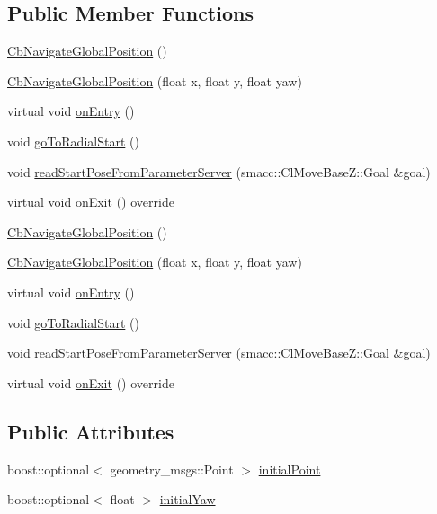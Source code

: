 \subsection*{Public Member Functions}
\begin{DoxyCompactItemize}
\item 
\hyperlink{classsm__dance__bot_1_1CbNavigateGlobalPosition_a18007aa2d7d814c39361d20c83694997}{Cb\+Navigate\+Global\+Position} ()
\item 
\hyperlink{classsm__dance__bot_1_1CbNavigateGlobalPosition_afec2628e2bf007b1356a3a328ac4f490}{Cb\+Navigate\+Global\+Position} (float x, float y, float yaw)
\item 
virtual void \hyperlink{classsm__dance__bot_1_1CbNavigateGlobalPosition_a281fe5c962ca5004f44e929159991c6a}{on\+Entry} ()
\item 
void \hyperlink{classsm__dance__bot_1_1CbNavigateGlobalPosition_a0832f7a7f205cc483be012aef9501312}{go\+To\+Radial\+Start} ()
\item 
void \hyperlink{classsm__dance__bot_1_1CbNavigateGlobalPosition_a81b78925b3ab8a426f471cb74d0b9756}{read\+Start\+Pose\+From\+Parameter\+Server} (smacc\+::\+Cl\+Move\+Base\+Z\+::\+Goal \&goal)
\item 
virtual void \hyperlink{classsm__dance__bot_1_1CbNavigateGlobalPosition_a63737ce810efefc8c29e6b1b332d2e11}{on\+Exit} () override
\item 
\hyperlink{classsm__dance__bot_1_1CbNavigateGlobalPosition_a18007aa2d7d814c39361d20c83694997}{Cb\+Navigate\+Global\+Position} ()
\item 
\hyperlink{classsm__dance__bot_1_1CbNavigateGlobalPosition_afec2628e2bf007b1356a3a328ac4f490}{Cb\+Navigate\+Global\+Position} (float x, float y, float yaw)
\item 
virtual void \hyperlink{classsm__dance__bot_1_1CbNavigateGlobalPosition_a281fe5c962ca5004f44e929159991c6a}{on\+Entry} ()
\item 
void \hyperlink{classsm__dance__bot_1_1CbNavigateGlobalPosition_a0832f7a7f205cc483be012aef9501312}{go\+To\+Radial\+Start} ()
\item 
void \hyperlink{classsm__dance__bot_1_1CbNavigateGlobalPosition_a81b78925b3ab8a426f471cb74d0b9756}{read\+Start\+Pose\+From\+Parameter\+Server} (smacc\+::\+Cl\+Move\+Base\+Z\+::\+Goal \&goal)
\item 
virtual void \hyperlink{classsm__dance__bot_1_1CbNavigateGlobalPosition_a63737ce810efefc8c29e6b1b332d2e11}{on\+Exit} () override
\end{DoxyCompactItemize}
\subsection*{Public Attributes}
\begin{DoxyCompactItemize}
\item 
boost\+::optional$<$ geometry\+\_\+msgs\+::\+Point $>$ \hyperlink{classsm__dance__bot_1_1CbNavigateGlobalPosition_a7774933671827d6111b3d7e139f56ca7}{initial\+Point}
\item 
boost\+::optional$<$ float $>$ \hyperlink{classsm__dance__bot_1_1CbNavigateGlobalPosition_ab7aebde14030bf36949d85f13ce3a685}{initial\+Yaw}
\end{DoxyCompactItemize}
